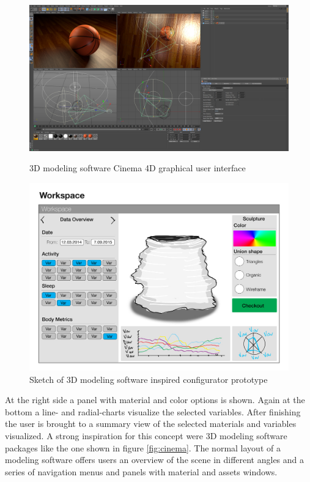 \documentclass[../medieninformatik-arbeit.tex]{subfiles}
\begin{document}
\begin{figure}[hb]
\centering
\begin{minipage}{.45\textwidth}
\centering
  \includegraphics[width=1.06\textwidth,trim=0mm 0mm 50mm 0mm,clip=true]{Prototype/img/cinema4d}
  \caption{3D modeling software Cinema 4D graphical user interface\cite{cinema4d}}
  \label{fig:cinema}
\end{minipage}
\begin{minipage}{.45\textwidth}
\centering
  \includegraphics[width=1.0\linewidth,trim=0mm 0mm 0mm 28mm,clip=true]{Prototype/img/ui_proto2}
  \caption{Sketch of 3D modeling software inspired configurator prototype}
  \label{fig:uiproto2}
\end{minipage}
\end{figure}

At the right side a panel with material and color options is shown. Again at the bottom a line- and radial-charts visualize the selected variables. After finishing the user is brought to a summary view of the selected materials and variables visualized. A strong inspiration for this concept were 3D modeling software packages like the one shown in figure \ref{fig:cinema}. The normal layout of a modeling software offers users an overview of the scene in different angles and a series of navigation menus and panels with material and assets windows. 
\end{document}
